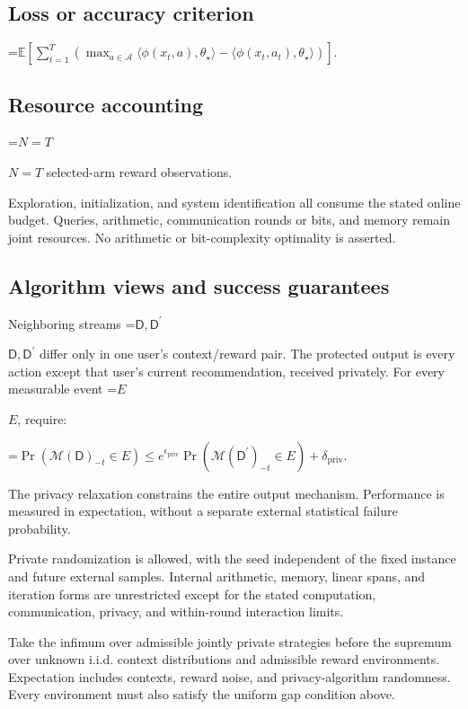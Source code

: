\documentclass[10pt,a4paper]{article}
\newcommand{\AtlasMath}[1]{\par\begingroup\centering\setbox0=\hbox{$\displaystyle #1$}\ifdim\wd0>1.4\linewidth\typeout{ATLAS WIDE FORMULA: \the\wd0}\fi\ifdim\wd0>\linewidth\resizebox{\linewidth}{!}{\box0}\else\box0\fi\par\endgroup}
\newcommand{\AtlasInlineMath}[1]{\begingroup\setbox0=\hbox{$#1$}\ifdim\wd0>.4\linewidth\endgroup\AtlasMath{#1}\else\endgroup$#1$\fi}
\begin{document}
\subsection{Loss or accuracy criterion}

\AtlasMath{\mathbb{E}\!\left[\sum_{t=1}^{T}\left(\max_{a\in\mathcal{A}}\langle\phi(x_t,a),\theta_\star\rangle-\langle\phi(x_t,a_t),\theta_\star\rangle\right)\right].}


\subsection{Resource accounting}
\AtlasInlineMath{N=T} selected-arm reward observations.

Exploration, initialization, and system identification all consume the stated online budget. Queries, arithmetic, communication rounds or bits, and memory remain joint resources. No arithmetic or bit-complexity optimality is asserted.

\subsection{Algorithm views and success guarantees}
Neighboring streams \AtlasInlineMath{\mathsf D,\mathsf D^{\prime}} differ only in one user's context/reward pair. The protected output is every action except that user's current recommendation, received privately. For every measurable event \AtlasInlineMath{E}, require:


\AtlasMath{\Pr\!\left(\mathcal{M}(\mathsf D)_{-t}\in E\right)\le e^{\epsilon_{\mathrm{priv}}}\Pr\!\left(\mathcal{M}(\mathsf D^{\prime})_{-t}\in E\right)+\delta_{\mathrm{priv}}.}


The privacy relaxation constrains the entire output mechanism. Performance is measured in expectation, without a separate external statistical failure probability.

Private randomization is allowed, with the seed independent of the fixed instance and future external samples. Internal arithmetic, memory, linear spans, and iteration forms are unrestricted except for the stated computation, communication, privacy, and within-round interaction limits.

Take the infimum over admissible jointly private strategies before the supremum over unknown i.i.d. context distributions and admissible reward environments. Expectation includes contexts, reward noise, and privacy-algorithm randomness. Every environment must also satisfy the uniform gap condition above.
\end{document}

